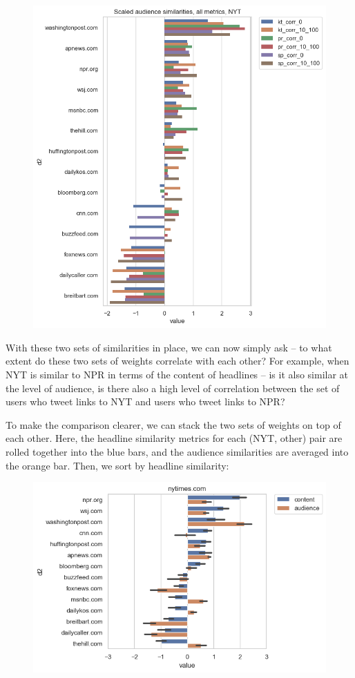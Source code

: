 \documentclass{scrartcl}
\begin{document}
\begin{figure}[H]
  \centering
  \includegraphics[height=0.5\textheight]{figures/ca-nyt-audience.png}
\end{figure}

With these two sets of similarities in place, we can now simply ask -- to what extent do these two sets of weights correlate with each other? For example, when NYT is similar to NPR in terms of the content of headlines -- is it also similar at the level of audience, is there also a high level of correlation between the set of users who tweet links to NYT and users who tweet links to NPR?

To make the comparison clearer, we can stack the two sets of weights on top of each other. Here, the headline similarity metrics for each (NYT, other) pair are rolled together into the blue bars, and the audience similarities are averaged into the orange bar. Then, we sort by headline similarity:

\begin{figure}[H]
  \centering
  \includegraphics[width=\textwidth]{figures/ca-nytimes-composite.png}
\end{figure}
\end{document}
